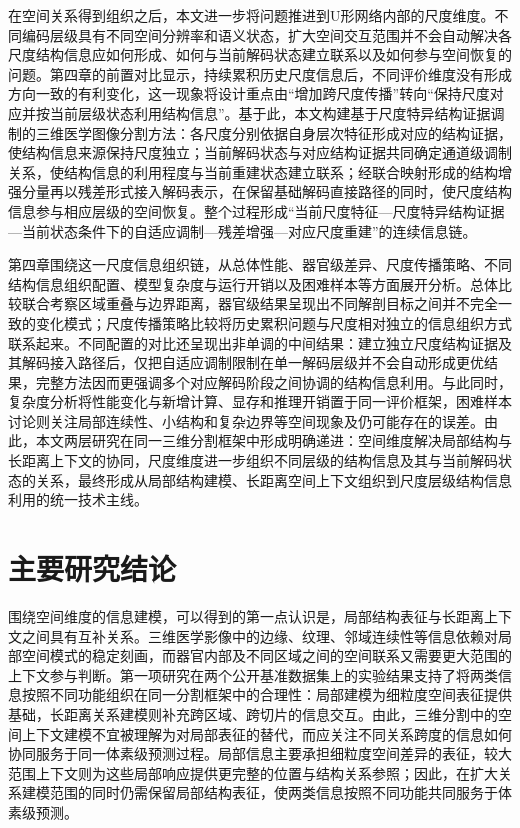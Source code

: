 在空间关系得到组织之后，本文进一步将问题推进到U形网络内部的尺度维度。不同编码层级具有不同空间分辨率和语义状态，扩大空间交互范围并不会自动解决各尺度结构信息应如何形成、如何与当前解码状态建立联系以及如何参与空间恢复的问题。第四章的前置对比显示，持续累积历史尺度信息后，不同评价维度没有形成方向一致的有利变化，这一现象将设计重点由“增加跨尺度传播”转向“保持尺度对应并按当前层级状态利用结构信息”。基于此，本文构建基于尺度特异结构证据调制的三维医学图像分割方法：各尺度分别依据自身层次特征形成对应的结构证据，使结构信息来源保持尺度独立；当前解码状态与对应结构证据共同确定通道级调制关系，使结构信息的利用程度与当前重建状态建立联系；经联合映射形成的结构增强分量再以残差形式接入解码表示，在保留基础解码直接路径的同时，使尺度结构信息参与相应层级的空间恢复。整个过程形成“当前尺度特征—尺度特异结构证据—当前状态条件下的自适应调制—残差增强—对应尺度重建”的连续信息链。

第四章围绕这一尺度信息组织链，从总体性能、器官级差异、尺度传播策略、不同结构信息组织配置、模型复杂度与运行开销以及困难样本等方面展开分析。总体比较联合考察区域重叠与边界距离，器官级结果呈现出不同解剖目标之间并不完全一致的变化模式；尺度传播策略比较将历史累积问题与尺度相对独立的信息组织方式联系起来。不同配置的对比还呈现出非单调的中间结果：建立独立尺度结构证据及其解码接入路径后，仅把自适应调制限制在单一解码层级并不会自动形成更优结果，完整方法因而更强调多个对应解码阶段之间协调的结构信息利用。与此同时，复杂度分析将性能变化与新增计算、显存和推理开销置于同一评价框架，困难样本讨论则关注局部连续性、小结构和复杂边界等空间现象及仍可能存在的误差。由此，本文两层研究在同一三维分割框架中形成明确递进：空间维度解决局部结构与长距离上下文的协同，尺度维度进一步组织不同层级的结构信息及其与当前解码状态的关系，最终形成从局部结构建模、长距离空间上下文组织到尺度层级结构信息利用的统一技术主线。

\section{主要研究结论}

围绕空间维度的信息建模，可以得到的第一点认识是，局部结构表征与长距离上下文之间具有互补关系。三维医学影像中的边缘、纹理、邻域连续性等信息依赖对局部空间模式的稳定刻画，而器官内部及不同区域之间的空间联系又需要更大范围的上下文参与判断。第一项研究在两个公开基准数据集上的实验结果支持了将两类信息按照不同功能组织在同一分割框架中的合理性：局部建模为细粒度空间表征提供基础，长距离关系建模则补充跨区域、跨切片的信息交互。由此，三维分割中的空间上下文建模不宜被理解为对局部表征的替代，而应关注不同关系跨度的信息如何协同服务于同一体素级预测过程。局部信息主要承担细粒度空间差异的表征，较大范围上下文则为这些局部响应提供更完整的位置与结构关系参照；因此，在扩大关系建模范围的同时仍需保留局部结构表征，使两类信息按照不同功能共同服务于体素级预测。

